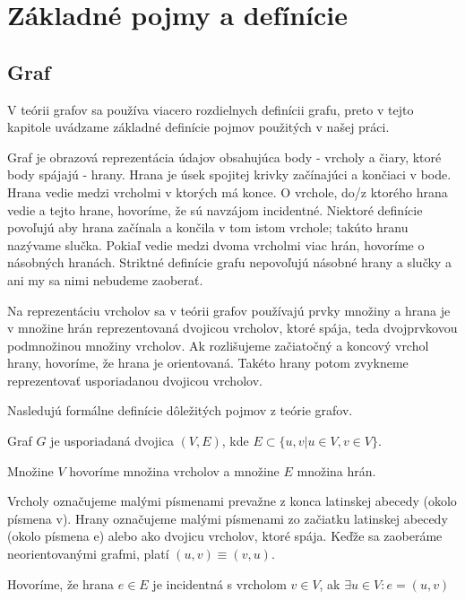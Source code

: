 \chapter{Základné pojmy a defínície}
\thispagestyle{empty}


\section{Graf}
V teórii grafov sa používa viacero rozdielnych definícii grafu, preto v
tejto kapitole uvádzame základné definície pojmov použitých v našej práci.

Graf je obrazová reprezentácia údajov obsahujúca body - vrcholy a čiary,
ktoré body spájajú - hrany. Hrana je úsek spojitej krivky začínajúci a 
končiaci v bode. Hrana vedie medzi vrcholmi v ktorých má konce.
O vrchole, do/z ktorého hrana vedie a tejto hrane, hovoríme, 
že sú navzájom incidentné. Niektoré definície povoľujú aby hrana začínala a 
končila v tom istom vrchole; takúto hranu nazývame slučka. 
Pokiaľ vedie medzi dvoma vrcholmi viac hrán, hovoríme o násobných hranách. 
Striktné definície grafu nepovoľujú násobné hrany a slučky a ani my sa nimi 
nebudeme zaoberať.

Na reprezentáciu vrcholov sa v teórii grafov používajú prvky množiny a 
hrana je v množine 
hrán reprezentovaná dvojicou vrcholov, ktoré spája, teda dvojprvkovou
podmnožinou množiny vrcholov. Ak rozlišujeme začiatočný a koncový vrchol
hrany, hovoríme, že hrana je orientovaná. Takéto hrany potom zvykneme
reprezentovať usporiadanou dvojicou vrcholov.

Nasledujú formálne definície dôležitých pojmov z teórie grafov.

\begin{defin}
Graf $G$ je usporiadaná dvojica $(V,E)$, kde
$E \subset \{u,v | u \in V, v \in V\}$.

Množine $V$ hovoríme množina vrcholov a množine $E$ množina hrán.

Vrcholy označujeme malými písmenami prevažne z konca latinskej abecedy 
(okolo písmena v). Hrany označujeme malými písmenami zo začiatku latinskej 
abecedy (okolo písmena e) alebo ako dvojicu vrcholov, ktoré spája. Keďže sa
zaoberáme neorientovanými grafmi, platí
$(u,v) \equiv (v,u)$.
\end{defin}

\begin{defin}
Hovoríme, že hrana $e \in E$ je incidentná s vrcholom $v \in V$, ak
$\exists  u \in  V : e = (u,v) $
\end{defin}

